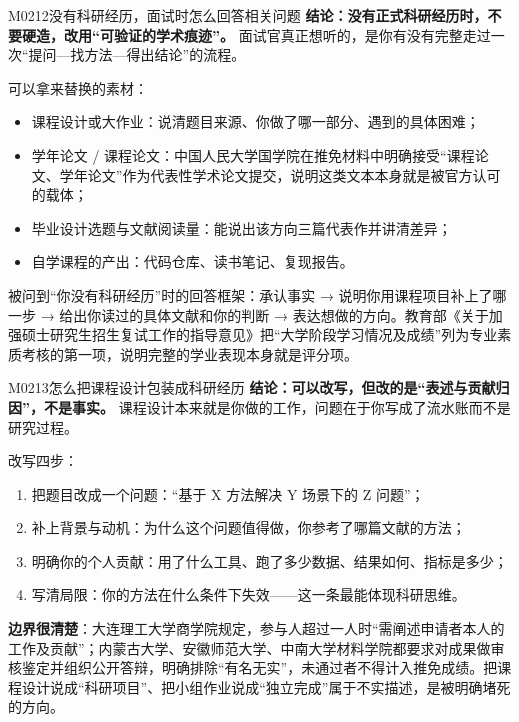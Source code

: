 \begin{qa}{M0212}{没有科研经历，面试时怎么回答相关问题}
\textbf{结论：没有正式科研经历时，不要硬造，改用“可验证的学术痕迹”。} 面试官真正想听的，是你有没有完整走过一次“提问—找方法—得出结论”的流程。

可以拿来替换的素材：
\begin{itemize}
  \item 课程设计或大作业：说清题目来源、你做了哪一部分、遇到的具体困难；
  \item 学年论文 / 课程论文：中国人民大学国学院在推免材料中明确接受“课程论文、学年论文”作为代表性学术论文提交，说明这类文本本身就是被官方认可的载体；
  \item 毕业设计选题与文献阅读量：能说出该方向三篇代表作并讲清差异；
  \item 自学课程的产出：代码仓库、读书笔记、复现报告。
\end{itemize}

被问到“你没有科研经历”时的回答框架：承认事实 → 说明你用课程项目补上了哪一步 → 给出你读过的具体文献和你的判断 → 表达想做的方向。教育部《关于加强硕士研究生招生复试工作的指导意见》把“大学阶段学习情况及成绩”列为专业素质考核的第一项，说明完整的学业表现本身就是评分项。
\end{qa}

\begin{qa}{M0213}{怎么把课程设计包装成科研经历}
\textbf{结论：可以改写，但改的是“表述与贡献归因”，不是事实。} 课程设计本来就是你做的工作，问题在于你写成了流水账而不是研究过程。

改写四步：
\begin{enumerate}
  \item 把题目改成一个问题：“基于 X 方法解决 Y 场景下的 Z 问题”；
  \item 补上背景与动机：为什么这个问题值得做，你参考了哪篇文献的方法；
  \item 明确你的个人贡献：用了什么工具、跑了多少数据、结果如何、指标是多少；
  \item 写清局限：你的方法在什么条件下失效——这一条最能体现科研思维。
\end{enumerate}

\textbf{边界很清楚}：大连理工大学商学院规定，参与人超过一人时“需阐述申请者本人的工作及贡献”；内蒙古大学、安徽师范大学、中南大学材料学院都要求对成果做审核鉴定并组织公开答辩，明确排除“有名无实”，未通过者不得计入推免成绩。把课程设计说成“科研项目”、把小组作业说成“独立完成”属于不实描述，是被明确堵死的方向。
\end{qa}

